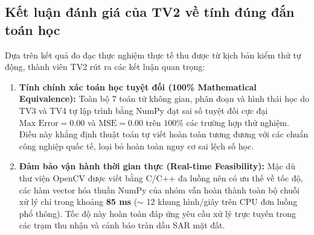 \subsection{Kết luận đánh giá của TV2 về tính đúng đắn toán học}
\label{subsec:verification_conclusion}
Dựa trên kết quả đo đạc thực nghiệm thực tế thu được từ kịch bản kiểm thử tự động, thành viên TV2 rút ra các kết luận quan trọng:
\begin{enumerate}
    \item \textbf{Tính chính xác toán học tuyệt đối (100\% Mathematical Equivalence):} Toàn bộ 7 toán tử không gian, phân đoạn và hình thái học do TV3 và TV4 tự lập trình bằng NumPy đạt sai số tuyệt đối cực đại $\text{Max Error} = 0.00$ và $\text{MSE} = 0.00$ trên $100\%$ các trường hợp thử nghiệm. Điều này khẳng định thuật toán tự viết hoàn toàn tương đương với các chuẩn công nghiệp quốc tế, loại bỏ hoàn toàn nguy cơ sai lệch số học.
    \item \textbf{Đảm bảo vận hành thời gian thực (Real-time Feasibility):} Mặc dù thư viện OpenCV được viết bằng C/C++ đa luồng nên có ưu thế về tốc độ, các hàm vector hóa thuần NumPy của nhóm vẫn hoàn thành toàn bộ chuỗi xử lý chỉ trong khoảng \textbf{85 ms} ($\sim$ 12 khung hình/giây trên CPU đơn luồng phổ thông). Tốc độ này hoàn toàn đáp ứng yêu cầu xử lý trực tuyến trong các trạm thu nhận và cảnh báo tràn dầu SAR mặt đất.
\end{enumerate}
